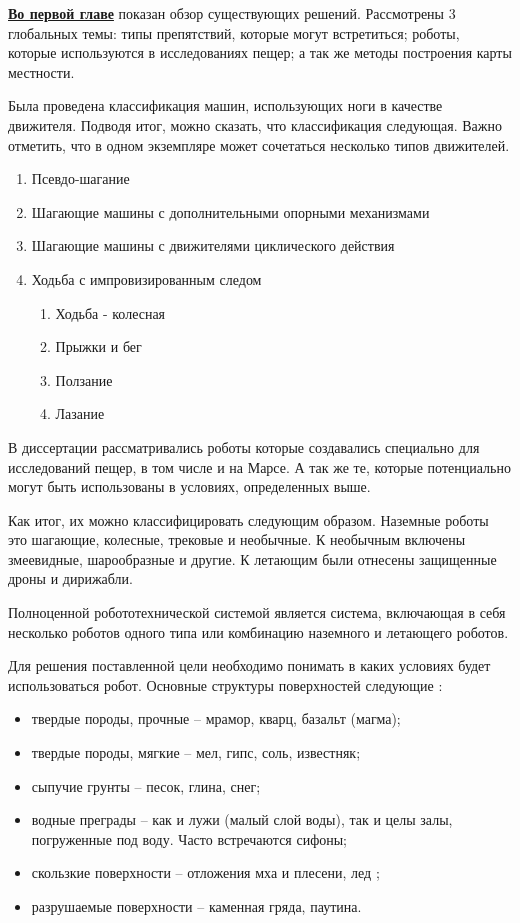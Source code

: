 
\textbf{\underline{Во первой главе}} показан обзор существующих решений. Рассмотрены 3 глобальных темы: типы препятствий, которые могут встретиться; роботы, которые используются в исследованиях пещер; а так же методы построения карты местности.

Была проведена классификация машин, использующих ноги в качестве движителя. Подводя итог, можно сказать, что классификация следующая. Важно отметить, что в одном экземпляре может сочетаться несколько типов движителей.
\begin{enumerate}
    \item Псевдо-шагание
    \item Шагающие машины с дополнительными опорными механизмами
    \item Шагающие машины с движителями циклического действия
    \item Ходьба с импровизированным следом
    \begin{enumerate}
    \item Ходьба - колесная
    \item Прыжки и бег
    \item Ползание
    \item Лазание
    \end{enumerate}
    \end{enumerate}
    
В диссертации рассматривались роботы которые создавались специально для исследований пещер, в том числе и на Марсе. А так же те, которые потенциально могут быть использованы в условиях, определенных выше.

Как итог, их можно классифицировать следующим образом. Наземные роботы это шагающие, колесные, трековые и необычные. К необычным включены змеевидные, шарообразные и другие. К летающим были отнесены защищенные дроны и дирижабли.

Полноценной робототехнической системой является система, включающая в себя несколько роботов одного типа или комбинацию наземного и летающего роботов.

Для решения поставленной цели необходимо понимать в каких условиях будет использоваться робот. Основные структуры поверхностей следующие :
\begin{itemize}
    \item твердые породы, прочные -- мрамор, кварц, базальт (магма);
    \item твердые породы, мягкие -- мел, гипс, соль, известняк;
    \item сыпучие грунты -- песок, глина, снег;
    \item водные преграды -- как и лужи (малый слой воды), так и целы залы, погруженные под воду. Часто встречаются сифоны;
    \item скользкие поверхности -- отложения мха и плесени, лед ;
    \item разрушаемые поверхности -- каменная гряда, паутина.
\end{itemize}



